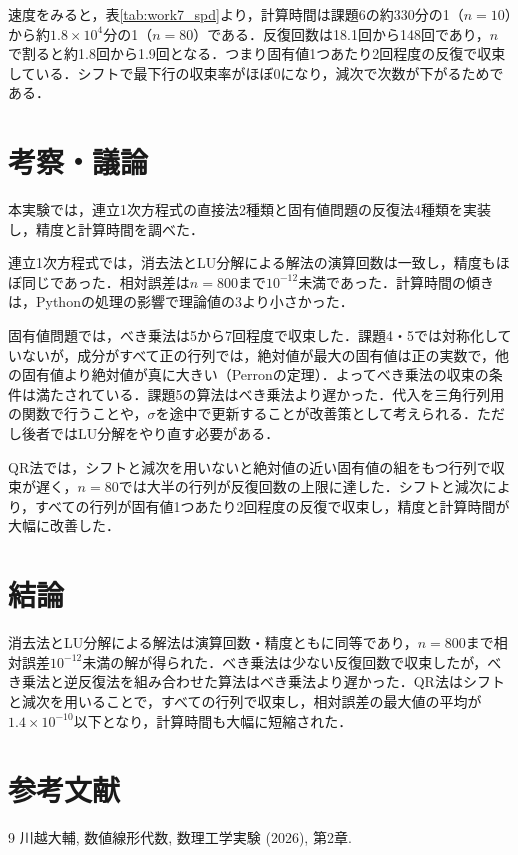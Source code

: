 \documentclass{jarticle}
\begin{document}
速度をみると，表\ref{tab:work7_spd}より，計算時間は課題6の約330分の1（$n=10$）から約$1.8\times10^4$分の1（$n=80$）である．反復回数は18.1回から148回であり，$n$で割ると約1.8回から1.9回となる．つまり固有値1つあたり2回程度の反復で収束している．シフトで最下行の収束率がほぼ0になり，減次で次数が下がるためである．

\clearpage
\section{考察・議論}

本実験では，連立1次方程式の直接法2種類と固有値問題の反復法4種類を実装し，精度と計算時間を調べた．

連立1次方程式では，消去法とLU分解による解法の演算回数は一致し，精度もほぼ同じであった．相対誤差は$n=800$まで$10^{-12}$未満であった．計算時間の傾きは，Pythonの処理の影響で理論値の3より小さかった．

固有値問題では，べき乗法は5から7回程度で収束した．課題4・5では対称化していないが，成分がすべて正の行列では，絶対値が最大の固有値は正の実数で，他の固有値より絶対値が真に大きい（Perronの定理）．よってべき乗法の収束の条件は満たされている．課題5の算法はべき乗法より遅かった．代入を三角行列用の関数で行うことや，$\sigma$を途中で更新することが改善策として考えられる．ただし後者ではLU分解をやり直す必要がある．

QR法では，シフトと減次を用いないと絶対値の近い固有値の組をもつ行列で収束が遅く，$n=80$では大半の行列が反復回数の上限に達した．シフトと減次により，すべての行列が固有値1つあたり2回程度の反復で収束し，精度と計算時間が大幅に改善した．
\section{結論}

消去法とLU分解による解法は演算回数・精度ともに同等であり，$n=800$まで相対誤差$10^{-12}$未満の解が得られた．べき乗法は少ない反復回数で収束したが，べき乗法と逆反復法を組み合わせた算法はべき乗法より遅かった．QR法はシフトと減次を用いることで，すべての行列で収束し，相対誤差の最大値の平均が$1.4\times10^{-10}$以下となり，計算時間も大幅に短縮された．
\section{参考文献}

\begin{thebibliography}{9}
 川越大輔, 数値線形代数, 数理工学実験 (2026), 第2章.
\end{thebibliography}
\end{document}

